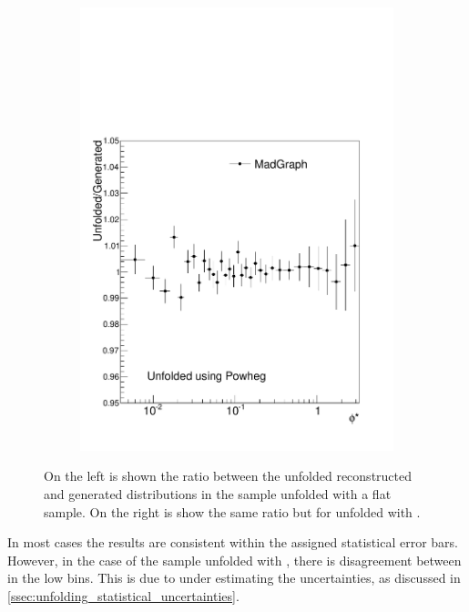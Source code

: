 \begin{figure}[!htbp]
\begin{subfigure}[b]{\SideBySidePlotWidth}
        \includegraphics[width=\textwidth]{figures/BinM_PM.pdf}
        \caption{}
        \label{fig:unfolding_madgraph_with_powheg}
    \end{subfigure}
    \caption[
        The ratio of reconstructed over generated \phistar in MC unfolded with
        the other generator sample.
    ]{
        On the left is shown the ratio between the unfolded reconstructed and
        generated \phistar distributions in the \POWHEG sample unfolded with a
        flat \MADGRAPH sample. On the right is show the same ratio but for
        \MADGRAPH unfolded with \POWHEG.
    }
    \label{fig:cross_mc_unfolding}
\end{figure}

In most cases the results are consistent within the assigned statistical error
bars. However, in the case of the \MADGRAPH sample unfolded with \POWHEG, there
is disagreement between in the low \phistar bins. This is due to \RooUnfold
under estimating the uncertainties, as discussed in
\cref{ssec:unfolding_statistical_uncertainties}.

